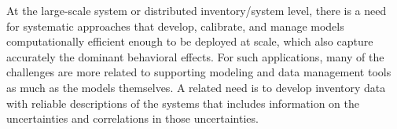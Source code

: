 At the large-scale system or distributed inventory/system level, there is a need for systematic approaches that develop, calibrate, and manage models computationally efficient enough to be deployed at scale, which also capture accurately the dominant behavioral effects. For such applications, many of the challenges are more related to supporting modeling and data management tools as much as the models themselves. A related need is to develop inventory data with reliable descriptions of the systems that includes information on the uncertainties and correlations in those uncertainties.

